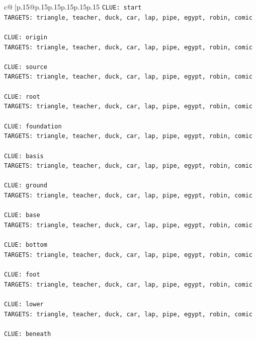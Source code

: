 \documentclass{article}
\begin{document}
{\begin{supertabular}{c@{$\;$}|p{.15\linewidth}@{}p{.15\linewidth}p{.15\linewidth}p{.15\linewidth}p{.15\linewidth}p{.15\linewidth}}
{{{\texttt{CLUE: start} \\
\texttt{TARGETS: triangle, teacher, duck, car, lap, pipe, egypt, robin, comic} \\
\\ 
\texttt{CLUE: origin} \\
\texttt{TARGETS: triangle, teacher, duck, car, lap, pipe, egypt, robin, comic} \\
\\ 
\texttt{CLUE: source} \\
\texttt{TARGETS: triangle, teacher, duck, car, lap, pipe, egypt, robin, comic} \\
\\ 
\texttt{CLUE: root} \\
\texttt{TARGETS: triangle, teacher, duck, car, lap, pipe, egypt, robin, comic} \\
\\ 
\texttt{CLUE: foundation} \\
\texttt{TARGETS: triangle, teacher, duck, car, lap, pipe, egypt, robin, comic} \\
\\ 
\texttt{CLUE: basis} \\
\texttt{TARGETS: triangle, teacher, duck, car, lap, pipe, egypt, robin, comic} \\
\\ 
\texttt{CLUE: ground} \\
\texttt{TARGETS: triangle, teacher, duck, car, lap, pipe, egypt, robin, comic} \\
\\ 
\texttt{CLUE: base} \\
\texttt{TARGETS: triangle, teacher, duck, car, lap, pipe, egypt, robin, comic} \\
\\ 
\texttt{CLUE: bottom} \\
\texttt{TARGETS: triangle, teacher, duck, car, lap, pipe, egypt, robin, comic} \\
\\ 
\texttt{CLUE: foot} \\
\texttt{TARGETS: triangle, teacher, duck, car, lap, pipe, egypt, robin, comic} \\
\\ 
\texttt{CLUE: lower} \\
\texttt{TARGETS: triangle, teacher, duck, car, lap, pipe, egypt, robin, comic} \\
\\ 
\texttt{CLUE: beneath} \\
}}}
\end{supertabular}}
\end{document}
